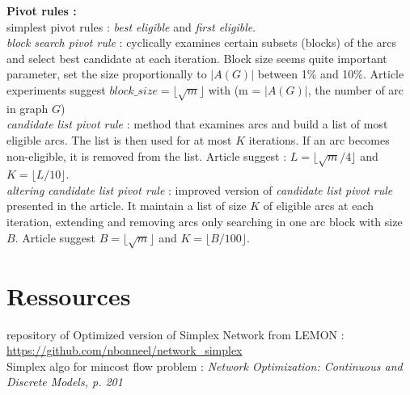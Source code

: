 \documentclass{article}
\begin{document}
\noindent\textbf{Pivot rules :}\\
\noindent simplest pivot rules : \textit{best eligible} and \textit{first eligible}.\\

\noindent\textit{block search pivot rule} : cyclically examines certain subsets (blocks) of the arcs and select best candidate at each iteration. Block size seems quite important parameter, set the size proportionally to $|A(G)|$ between 1\% and 10\%. Article experiments suggest $block\_size = \lfloor\sqrt{m}\rfloor$ with (m = $|A(G)|$, the number of arc in graph $G$)\\

\noindent\textit{candidate list pivot rule} : method that examines arcs and build a list of most eligible arcs. The list is then used for at most $K$ iterations. If an arc becomes non-eligible, it is removed from the list. Article suggest : $L = \lfloor\sqrt{m}/4\rfloor$ and $K = \lfloor L/10\rfloor$.\\

\noindent\textit{altering candidate list pivot rule} : improved version of \textit{candidate list pivot rule} presented in the article. It maintain a list of size $K$ of eligible arcs at each iteration, extending and removing arcs only searching in one arc block with size $B$. Article suggest $B = \lfloor\sqrt{m}\rfloor$ and $K = \lfloor B/100\rfloor$.

\section*{Ressources}

\noindent repository of Optimized version of Simplex Network from LEMON : \url{https://github.com/nbonneel/network_simplex}\\
Simplex algo for mincost flow problem : \textit{Network Optimization: Continuous and Discrete Models, p. 201}
\end{document}
